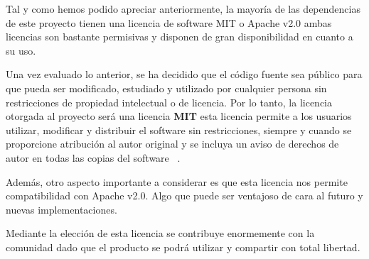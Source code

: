 Tal y como hemos podido apreciar anteriormente, la mayoría de las dependencias de este proyecto tienen una licencia de software MIT o Apache v2.0 ambas licencias son bastante permisivas y disponen de gran disponibilidad en cuanto a su uso.

Una vez evaluado lo anterior, se ha decidido que el código fuente sea público para que pueda ser modificado, estudiado y utilizado por cualquier persona sin restricciones de propiedad intelectual o de licencia. Por lo tanto, la licencia otorgada al proyecto será una licencia \textbf{MIT} esta licencia permite a los usuarios utilizar, modificar y distribuir el software sin restricciones, siempre y cuando se proporcione atribución al autor original y se incluya un aviso de derechos de autor en todas las copias del software ~\cite{licenciamit:latex}.

Además, otro aspecto importante a considerar es que esta licencia nos permite compatibilidad con Apache v2.0. Algo que puede ser ventajoso de cara al futuro y nuevas implementaciones.

Mediante la elección de esta licencia se contribuye enormemente con la comunidad dado que el producto se podrá utilizar y compartir con total libertad.



